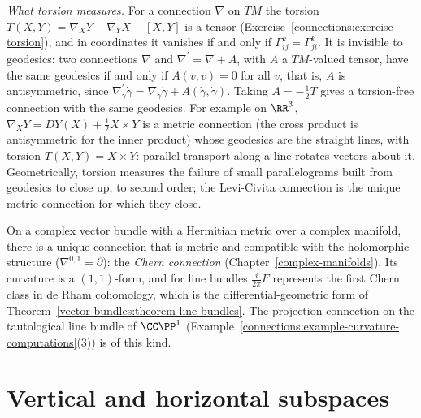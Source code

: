 \begin{remark}\label{connections:remark-torsion-meaning}
\emph{What torsion measures.} For a connection $\nabla$ on $TM$ the torsion $T(X, Y) = \nabla_XY - \nabla_YX - [X, Y]$ is a tensor (Exercise~\ref{connections:exercise-torsion}), and in coordinates it vanishes
if and only if $\Gamma^k_{ij} = \Gamma^k_{ji}$. It is invisible to geodesics: two connections $\nabla$ and $\nabla^{\prime} = \nabla + A$, with $A$ a $TM$-valued tensor, have the same geodesics if and only if
$A(v, v) = 0$ for all $v$, that is, $A$ is antisymmetric, since $\nabla^{\prime}_{\dot\gamma}\dot\gamma = \nabla_{\dot\gamma}\dot\gamma + A(\dot\gamma, \dot\gamma)$. Taking $A = -\frac12T$ gives a torsion-free connection
with the same geodesics. For example on $\RR^3$, $\nabla_XY = DY(X) + \frac12X \times Y$ is a metric connection (the cross product is antisymmetric for the inner product) whose geodesics are the straight
lines, with torsion $T(X, Y) = X \times Y$: parallel transport along a line rotates vectors about it. Geometrically, torsion measures the failure of small parallelograms built from geodesics to close
up, to second order; the Levi-Civita connection is the unique metric connection for which they close.
\end{remark}

\begin{example}\label{connections:example-chern-connection}
On a complex vector bundle with a Hermitian metric over a complex manifold, there is a unique connection that is metric and compatible with the holomorphic structure ($\nabla^{0,1} = \bar\partial$): the
\emph{Chern connection} (Chapter~\ref{complex-manifolds}). Its curvature is a $(1,1)$-form, and for line bundles $\frac{i}{2\pi}F$ represents the first Chern class in de Rham cohomology, which is the
differential-geometric form of Theorem~\ref{vector-bundles:theorem-line-bundles}. The projection connection on the tautological line bundle of $\CC\PP^1$
(Example~\ref{connections:example-curvature-computations}(3)) is of this kind.
\end{example}


\section{Vertical and horizontal subspaces}\label{connections:section-horizontal}

